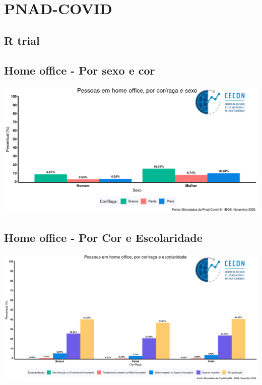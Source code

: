 \documentclass{SelfArx}
\begin{document}
\section*{PNAD-COVID}
\label{sec:org960229c}
\subsection*{R trial}
\label{sec:org3e5e8f7}
\subsection*{Home office - Por sexo e cor}
\label{sec:org76edeff}




\begin{center}
\includegraphics[width=.9\linewidth]{./figs/PNAD_COVID/home_sexo_cor.png}
\end{center}

\subsection*{Home office - Por Cor e Escolaridade}
\label{sec:orgcd24ed5}
\begin{center}
\includegraphics[width=.9\linewidth]{./figs/PNAD_COVID/home_edu_cor.png}
\end{center}
\end{document}

